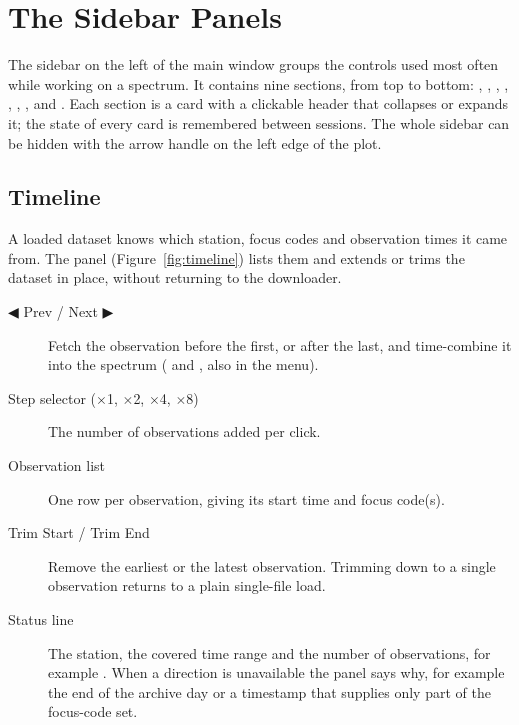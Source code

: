 \chapter{The Sidebar Panels}
\label{ch:sidebar}

The sidebar on the left of the main window groups the controls used most often while
working on a spectrum. It contains nine sections, from top to bottom:
, , , ,
, , ,  and
.
Each section is a card with a clickable header that collapses or expands it; the state of
every card is remembered between sessions. The whole sidebar can be hidden with the arrow
handle on the left edge of the plot.

\section{Timeline}
\label{sec:timeline}

A loaded dataset knows which station, focus codes and observation times it came from. The
 panel (Figure~\ref{fig:timeline}) lists them and extends or trims the
dataset in place, without returning to the downloader.


\begin{description}
  \item[◀ Prev / Next ▶] Fetch the observation before the first, or after the last, and
    time-combine it into the spectrum ( and ,
    also in the  menu).
  \item[Step selector (\(\times\)1, \(\times\)2, \(\times\)4, \(\times\)8)] The number of
    observations added per click.
  \item[Observation list] One row per observation, giving its start time and focus code(s).
  \item[Trim Start / Trim End] Remove the earliest or the latest observation. Trimming down
    to a single observation returns to a plain single-file load.
  \item[Status line] The station, the covered time range and the number of observations,
    for example . When a direction is unavailable
    the panel says why, for example the end of the archive day or a timestamp that supplies
    only part of the focus-code set.
\end{description}

